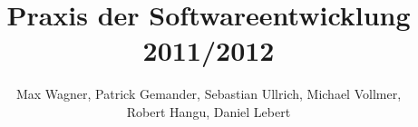 \documentclass{article}
\begin{document}
\title{Praxis der Softwareentwicklung 2011/2012}
\author{Max Wagner, Patrick Gemander, Sebastian Ullrich, Michael Vollmer, \\ Robert Hangu, Daniel Lebert}
\maketitle















\end{document}
